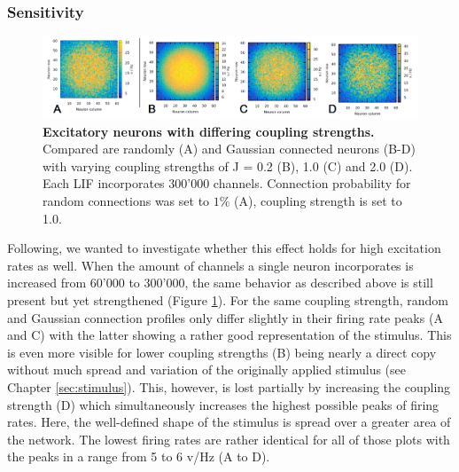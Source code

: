 \documentclass[14pt]{SelfArx} %
\numberwithin{equation}{section}
\begin{document}
\subsubsection{Sensitivity}
\begin{figure} [htb]
\centering
\includegraphics[width = 1.0\textwidth]{ex300_J.png}
\caption{\textbf{Excitatory neurons with differing coupling strengths.} Compared are randomly (A) and Gaussian connected neurons (B-D) with varying coupling strengths of J = 0.2 (B), 1.0 (C) and 2.0 (D). Each LIF incorporates 300'000 channels. Connection probability for random connections was set to $1 \%$ (A), coupling strength is set to 1.0.}
\label{fig:ex300j}
\end{figure}
Following, we wanted to investigate whether this effect holds for high excitation rates as well. \newline
When the amount of channels a single neuron incorporates is increased from 60'000 to 300'000, the same behavior as described above is still present but yet strengthened (Figure \ref{fig:ex300j}). For the same coupling strength, random and Gaussian connection profiles only differ slightly in their firing rate peaks (A and C) with the latter showing a rather good representation of the stimulus. This is even more visible for lower coupling strengths (B) being nearly a direct copy without much spread and variation of the originally applied stimulus (see Chapter \ref{sec:stimulus}). This, however, is lost partially by increasing the coupling strength (D) which simultaneously increases the highest possible peaks of firing rates. Here, the well-defined shape of the stimulus is spread over a greater area of the network. The lowest firing rates are rather identical for all of those plots with the peaks in a range from 5 to 6 v/Hz (A to D).
\end{document}
